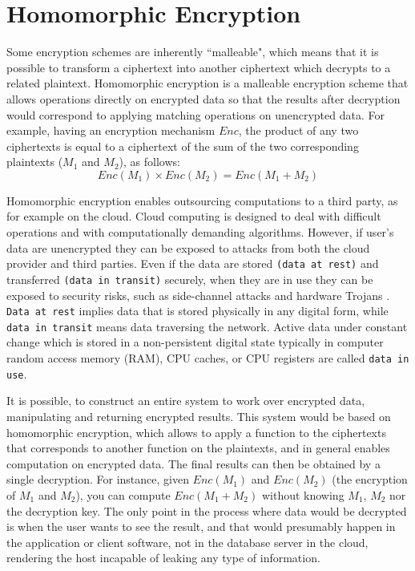 \section{Homomorphic Encryption}\label{s:homomorphic-encryption}

Some encryption schemes are inherently ``malleable", which means that it is possible to transform a ciphertext into another ciphertext which decrypts to a related plaintext.
Homomorphic encryption is a malleable encryption scheme that allows operations directly on encrypted data so that the results after decryption would correspond to applying matching operations on unencrypted data.
For example, having an encryption mechanism $Enc$, the product of any two ciphertexts is equal to a ciphertext of the sum of the two corresponding plaintexts ($M_1$ and $M_2$), as follows:
\begin{equation}\label{eq:homomorphic}
  Enc(M_1) \times Enc(M_2) = Enc(M_1 + M_2)
\end{equation}


Homomorphic encryption enables outsourcing computations to a third party, as for example on the cloud.
Cloud computing is designed to deal with difficult operations and with computationally demanding algorithms.
However, if user's data are unencrypted they can be exposed to attacks from both the cloud provider and third parties.
Even if the data are stored \texttt{(data at rest)} and transferred \texttt{(data in transit)} securely, when they are in use they can be exposed to security risks, such as side-channel attacks \cite{zhang2012cross} and hardware Trojans \cite{becker2013stealthy, tsoutsos2014advanced}.
\texttt{Data at rest} implies data that is stored physically in any digital form, while \texttt{data in transit} means data traversing the network.
Active data under constant change which is stored in a non-persistent digital state typically in computer random access memory (RAM), CPU caches, or CPU registers are called \texttt{data in use}.


It is possible, to construct an entire system to work over encrypted data, manipulating and returning encrypted results.
This system would be based on homomorphic encryption, which allows to apply a function to the ciphertexts that corresponds to another function on the plaintexts, and in general enables computation on encrypted data.
The final results can then be obtained by a single decryption.
For instance, given $Enc(M_1)$ and $Enc(M_2)$ (the encryption of $M_1$ and $M_2$), you can compute $Enc(M_1 + M_2)$ without knowing $M_1$, $M_2$ nor the decryption key.
The only point in the process where data would be decrypted is when the user wants to see the result, and that would presumably happen in the application or client software, not in the database server in the cloud, rendering the host incapable of leaking any type of information.


